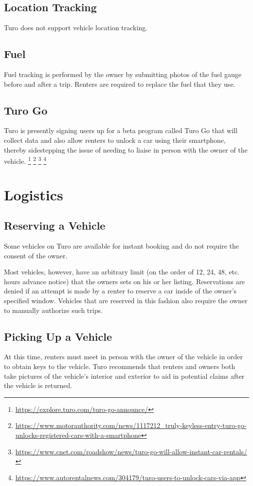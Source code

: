 \documentclass[review,12pt]{elsarticle}
\begin{document}
  \subsection{Location Tracking}
  Turo does not support vehicle location tracking.
  \subsection{Fuel}
  Fuel tracking is performed by the owner by submitting photos of the fuel gauge before and after a trip. Renters are required to replace the fuel that they use.
  \subsection{Turo Go}
  Turo is presently signing users up for a beta program called Turo Go that will collect data and also allow renters to unlock a car using their smartphone, thereby sidestepping the issue of needing to liaise in person with the owner of the vehicle.
  \footnote{\url{https://explore.turo.com/turo-go-announce/}}
  \footnote{\url{https://www.motorauthority.com/news/1117212_truly-keyless-entry-turo-go-unlocks-registered-cars-with-a-smartphone}
  }
  \footnote{\url{https://www.cnet.com/roadshow/news/turo-go-will-allow-instant-car-rentals/}
  }
  \footnote{\url{https://www.autorentalnews.com/304179/turo-users-to-unlock-cars-via-app}
  }

\section{Logistics}
  \subsection{Reserving a Vehicle}
  Some vehicles on Turo are available for instant booking and do not require the consent of the owner.

  Most vehicles, however, have an arbitrary limit (on the order of 12, 24, 48, etc. hours advance notice) that the owners sets on his or her listing. Reservations are denied if an attempt is made by a renter to reserve a car inside of the owner's specified window. Vehicles that are reserved in this fashion also require the owner to manually authorize such trips.

  \subsection{Picking Up a Vehicle}
  At this time, renters must meet in person with the owner of the vehicle in order to obtain keys to the vehicle. Turo recommends that renters and owners both take pictures of the vehicle's interior and exterior to aid in potential claims after the vehicle is returned.
\end{document}
